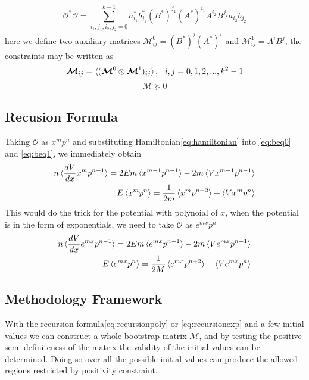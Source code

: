 \documentclass[aps,prl, preprint,amsmath, amssymb]{revtex4-2}
\begin{document}
\begin{equation}
    \mathcal{O}^* \mathcal{O} = \sum_{i_1, j_1, i_2, j_2 = 0}^{k - 1} a_{i_1}^* b_{j_1}^* (B^*)^{j_1} (A^*)^{i_1} A^{i_2} B^{j_2} a_{i_2} b_{j_2}
\end{equation}
here we define two auxiliary matrices $\bm{\mathcal{M}}_{ij}^0 = (B^*)^j (A^*)^i$ and $\bm{\mathcal{M}}_{ij}^1 = A^i B^j$, the constraints may be written as
\begin{equation}
    \bm{\mathcal{M}}_{ij} = \braket{(\bm{\mathcal{M}}^0 \otimes \bm{\mathcal{M}}^1)_{ij}}, \ \ i, j = 0, 1, 2, ..., k^2 - 1
\end{equation}
\begin{equation}
    \bm{\mathcal{M}} \succeq 0
\end{equation}

\subsection{Recusion Formula}
Taking $\mathcal{O}$ as $x^m p^n$ and substituting Hamiltonian\eqref{eq:hamiltonian} into \eqref{eq:beq0} and \eqref{eq:beq1}, we immediately obtain
\begin{align}
    n \braket{\frac{d V}{d x} x^m p^{n - 1}} = 2E m \braket{x^{m - 1} p^{n - 1}} - 2m\braket{V x^{m - 1} p^{n - 1}} \notag \\ 
    E\braket{x^m p^n} = \frac1{2m}\braket{x^m p^{n + 2}} + \braket{V x^m p^n} \label{eq:recursionpoly}
\end{align}
This would do the trick for the potential with polynoial of $x$, when the potential is in the form of exponentials, we need to take $\mathcal{O}$ as $e^{mx} p^n$ 
\begin{align}
    n \braket{\frac{d V}{d x} e^{m x} p^{n - 1}} = 2Em\braket{e^{mx} p^{n - 1}} - 2m\braket{V e^{mx} p^{n - 1}}\notag \\ 
    E \braket{e^{mx} p^n} = \frac1{2M}\braket{e^{mx} p^{n + 2}} + \braket{Ve^{mx} p^n} \label{eq:recursionexp}
\end{align}

\subsection{Methodology Framework}
With the recursion formula\eqref{eq:recursionpoly} or \eqref{eq:recursionexp} and a few initial values we can construct a whole bootstrap matrix $\bm{\mathcal{M}}$, and by testing the positive semi definiteness of the matrix the validity of the initial values can be determined. Doing so over all the possible initial values can produce the allowed regions restricted by positivity constraint. 
\end{document}
